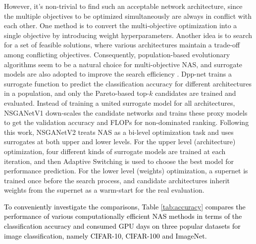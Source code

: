 \documentclass[journal]{IEEEtran}
\begin{document}
However, it's non-trivial to find such an acceptable network architecture, since the multiple objectives to be optimized simultaneously are always in conflict with each other. One method is to convert the multi-objective optimization into a single objective by introducing weight hyperparameters. Another idea is to search for a set of feasible solutions, where various architectures maintain a trade-off among conflicting objectives. Consequently, population-based evolutionary algorithms seem to be a natural choice for multi-objective NAS, and surrogate models are also adopted to improve the search efficiency \cite{jin2008pareto, dong2018dpp, lu2020multi, lu2020nsganetv2, lu2022surrogate}. Dpp-net \cite{dong2018dpp} trains a surrogate function to predict the classification accuracy for different architectures in a population, and only the Pareto-based top-$k$ candidates are trained and evaluated. Instead of training a united surrogate model for all architectures, NSGANetV1 \cite{lu2020multi} down-scales the candidate networks and trains these proxy models to get the validation accuracy and FLOPs for non-dominated ranking. Following this work, NSGANetV2 \cite{lu2020nsganetv2} treats NAS as a bi-level optimization task and uses surrogates at both upper and lower levels. For the upper level (architecture) optimization, four different kinds of surrogate models are trained at each iteration, and then Adaptive Switching is used to choose the best model for performance prediction. For the lower level (weights) optimization, a supernet is trained once before the search process, and candidate architectures inherit weights from the supernet as a warm-start for the real evaluation.

\textcolor{black}{To conveniently investigate the comparisons, Table \ref{tab:accuracy} compares the performance of various computationally efficient NAS methods in terms of the classification accuracy and consumed GPU days on three popular datasets for image classification, namely CIFAR-10, CIFAR-100 and ImageNet.}
\end{document}
